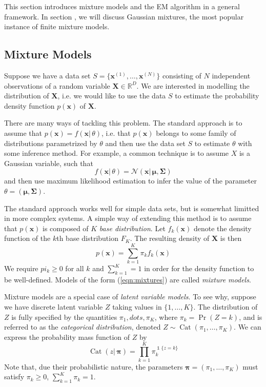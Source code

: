 \documentclass[final,3p,times,twocolumn]{elsarticle}
\DeclareMathOperator*{\Cat}{Cat}
\let\bs\boldsymbol
\DeclareMathOperator*{\id}{\mathds{1}}
\begin{document}
This section introduces mixture models and the EM algorithm in a general framework.
In section \label{sect:gmm}, we will discuss Gaussian mixtures, the most popular instance of finite mixture models.





\subsection{Mixture Models}
\label{sect:mixtures}
Suppose we have a data set $S = \{\bs x^{(1)},\dots,\bs x^{(N)}\}$ consisting of $N$ independent observations of a random variable $\bs X \in \mathbb{R}^D$.
We are interested in modelling the distribution of $\bs X$, i.e. we would like to use the data $S$ to estimate the probability density function $p(\bs x)$ of $\bs X$.

There are many ways of tackling this problem. 
The standard approach is to assume that $p(\bs x) = f(\bs x|\,\theta)$, i.e. that $p(\bs x)$ belongs to some family of distributions parametrized by $\theta$ and then use the data set $S$ to estimate $\theta$ with some inference method.
For example, a common technique is to assume $X$ is a Gaussian variable, such that 
\begin{equation}
f(\bs x |\,\theta) = \mathcal{N}(\bs x|\,\bs\mu,\bs \Sigma)
\end{equation}
and then use maximum likelihood estimation to infer the value of the parameter $\theta = (\bs\mu,\bs\Sigma)$.

The standard approach works well for simple data sets, but is somewhat limitted in more complex systems.
A simple way of extending this method is to assume that $p(\bs x)$ is composed of $K$ \emph{base distribution}.
Let $f_k(\bs x)$ denote the density function of the $k$th base distribution $F_K$.
The resulting density of $\bs X$ is then
\begin{equation}
\label{eqn:mixtures}
p(\bs x) = \sum_{k=1}^K \pi_k f_k(\bs x)
\end{equation}
We require $pi_k \geq 0$ for all $k$ and $\sum_{k=1}^K = 1$ in order for the density function to be well-defined.
Models of the form (\ref{eqn:mixtures}) are called \emph{mixture models}.

Mixture models are a special case of \emph{latent variable models}.
To see why, suppose we have discrete latent variable $Z$ taking values in $\{1,\dots,K\}$.
The distribution of $Z$ is fully specified by the quantities $\pi_1,dots,\pi_K$, where $\pi_k = \Pr(Z = k)$, and is referred to as the \emph{categorical distribution}, denoted $Z \sim \Cat(\pi_1, \dots,\pi_K)$.
We can express the probability mass function of $Z$ by
\begin{equation}
\label{eqn:cat}
\Cat(z|\,\bs\pi) = \prod_{k=1}^K \pi_k^{\id\{z=k\}}
\end{equation}
Note that, due their probabilistic nature, the parameters $\bs \pi = (\pi_1,\dots,\pi_K)$ must satisfy $\pi_k \geq 0$, $\sum_{k=1}^K \pi_k = 1$.
\end{document}
